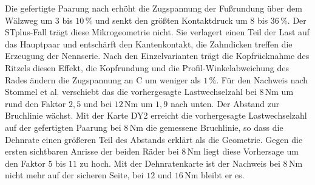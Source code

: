 Die gefertigte Paarung nach  erhöht die Zugspannung der Fußrundung über dem Wälzweg um $3$ bis $10$\,\% und senkt den größten Kontaktdruck um $8$ bis $36$\,\%. Der STplus-Fall trägt diese Mikrogeometrie nicht. Sie verlagert einen Teil der Last auf das Hauptpaar und entschärft den Kantenkontakt, die Zahndicken treffen die Erzeugung der Nennserie. Nach den Einzelvarianten trägt die Kopfrücknahme des Ritzels diesen Effekt, die Kopfrundung und die Profil-Winkelabweichung des Rades ändern die Zugspannung an C um weniger als $1$\,\%. Für den Nachweis nach Stommel et al. verschiebt das die vorhergesagte Lastwechselzahl bei $8$\,Nm um rund den Faktor $2{,}5$ und bei $12$\,Nm um $1{,}9$ nach unten. Der Abstand zur Bruchlinie wächst. Mit der Karte DY2 erreicht die vorhergesagte Lastwechselzahl auf der gefertigten Paarung bei $8$\,Nm die gemessene Bruchlinie, so dass die Dehnrate einen größeren Teil des Abstands erklärt als die Geometrie. Gegen die ersten sichtbaren Anrisse der beiden Räder bei $8$\,Nm liegt diese Vorhersage um den Faktor $5$ bis $11$ zu hoch. Mit der Dehnratenkarte ist der Nachweis bei $8$\,Nm nicht mehr auf der sicheren Seite, bei $12$ und $16$\,Nm bleibt er es.


